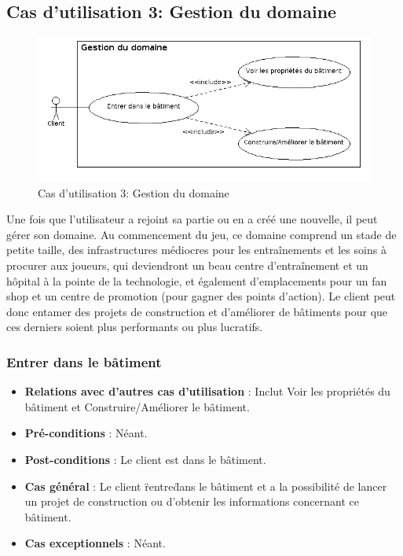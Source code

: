 \documentclass[a4paper,titlepage]{scrreprt}
\begin{document}
 \subsection{Cas d'utilisation 3: Gestion du domaine}
  \begin{figure}[H]
    \center
    \includegraphics[scale=0.5]{uml/useCaseView/GestionDomaine.png}
    \caption{Cas d'utilisation 3: Gestion du domaine}
  \end{figure}  
    Une fois que l'utilisateur a rejoint sa \gls{partie} ou en a créé une nouvelle, il peut gérer son domaine. Au commencement du jeu, ce domaine comprend un stade de petite taille, des infrastructures médiocres pour les entraînements et les soins à procurer aux joueurs, qui deviendront un beau centre d'entraînement et un hôpital à la pointe de la technologie, et également d'emplacements pour un fan shop et un centre de promotion (pour gagner des points d'action). Le client peut donc entamer des projets de construction et d'améliorer de bâtiments pour que ces derniers soient plus performants ou plus lucratifs.

    \subsubsection{Entrer dans le bâtiment}
      \begin{itemize}
        \item \textbf{Relations avec d'autres cas d'utilisation}  : Inclut Voir les propriétés du bâtiment et Construire/Améliorer le bâtiment.
        \item \textbf{Pré-conditions} : Néant.
        \item \textbf{Post-conditions} : Le client est dans le bâtiment.
        \item \textbf{Cas général} : Le client \"rentre\" dans le bâtiment et a la possibilité de lancer un projet de construction ou d'obtenir les informations concernant ce bâtiment.
        \item \textbf{Cas exceptionnels} : Néant.
      \end{itemize}
\end{document}
